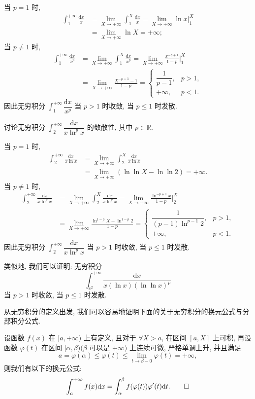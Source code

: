 \begin{solve}
当 $p=1$ 时,
\[
\begin{aligned}
  \int_1^{+\infty}\frac{\mathrm dx}{x}
  &=
  \lim_{X\to+\infty}\int_1^X\frac{\mathrm dx}{x}
  =
  \lim_{X\to+\infty}\ln x\big|_1^X\\
  &=
  \lim_{X\to+\infty}\ln X=+\infty;
\end{aligned}
\]
当 $p\ne1$ 时,
\[
\begin{aligned}
  \int_1^{+\infty}\frac{\mathrm dx}{x^p}
  &=
  \lim_{X\to+\infty}\int_1^X\frac{\mathrm dx}{x^p}
  =
  \lim_{X\to+\infty}\frac{x^{-p+1}}{1-p}\bigg|_1^X\\
  &=
  \lim_{X\to+\infty}\frac{X^{-p+1}-1}{1-p}
  =
  \begin{cases}
    \dfrac1{p-1}, & p>1,\\
    +\infty, & p<1.
  \end{cases}
\end{aligned}
\]
因此无穷积分 $\int_1^{+\infty}\dfrac{\mathrm dx}{x^p}$ 当 $p>1$ 时收敛, 当 $p\leqslant1$ 时发散.
\end{solve}


\begin{example}\label{example:ma-8-1-3}
讨论无穷积分 $\int_2^{+\infty}\dfrac{\mathrm dx}{x\ln^p x}$ 的敛散性, 其中 $p\in\mathbb R$.
\end{example}


\begin{solve}
当 $p=1$ 时,
\[
\begin{aligned}
  \int_2^{+\infty}\frac{\mathrm dx}{x\ln x}
  &=
  \lim_{X\to+\infty}\int_2^X\frac{\mathrm dx}{x\ln x}\\
  &=
  \lim_{X\to+\infty}(\ln\ln X-\ln\ln2)=+\infty.
\end{aligned}
\]
当 $p\ne1$ 时,
\[
\begin{aligned}
  \int_2^{+\infty}\frac{\mathrm dx}{x\ln^p x}
  &=
  \lim_{X\to+\infty}\int_2^X\frac{\mathrm dx}{x\ln^p x}
  =
  \lim_{X\to+\infty}\frac{\ln^{-p+1}x}{1-p}\bigg|_2^X\\
  &=
  \lim_{X\to+\infty}\frac{\ln^{1-p}X-\ln^{1-p}2}{1-p}
  =
  \begin{cases}
    \dfrac1{(p-1)\ln^{p-1}2}, & p>1,\\
    +\infty, & p<1.
  \end{cases}
\end{aligned}
\]
因此无穷积分 $\int_2^{+\infty}\dfrac{\mathrm dx}{x\ln^p x}$ 当 $p>1$ 时收敛, 当 $p\leqslant1$ 时发散.

类似地, 我们可以证明: 无穷积分
\[
  \int_{e^2}^{+\infty}
  \frac{\mathrm dx}{x(\ln x)(\ln\ln x)^p}
\]
当 $p>1$ 时收敛, 当 $p\leqslant1$ 时发散.

从无穷积分的定义出发, 我们可以容易地证明下面的关于无穷积分的换元公式与分部积分公式.

设函数 $f(x)$ 在 $[a,+\infty)$ 上有定义, 且对于 $\forall X>a$, 在区间 $[a,X]$ 上可积, 再设函数 $\varphi(t)$ 在区间 $[\alpha,\beta)(\beta$ 可以是 $+\infty)$ 上连续可微, 严格单调上升, 并且满足
\[
  a=\varphi(\alpha)\leq \varphi(t)\leq \lim_{t\to\beta-0}\varphi(t)=+\infty,
\]
则我们有以下的换元公式:
\[
  \int_a^{+\infty}f(x)\mathrm dx
  =
  \int_\alpha^\beta f(\varphi(t))\varphi'(t)\mathrm dt.
\qedhere
\]
\end{solve}


